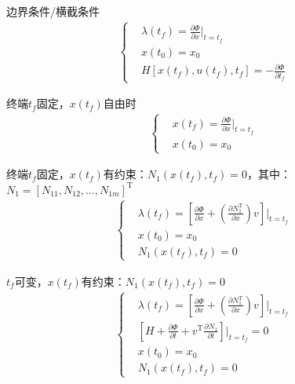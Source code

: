             边界条件/横截条件
            \begin{align*}
            \left\{
            \begin{aligned}
            & \lambda(t_f) = \frac{\partial \Phi}{\partial x}\Big|_{t=t_f}\\
            & x(t_0) = x_0\\
            & H[x(t_f),u(t_f),t_f] = -\frac{\partial \Phi}{\partial t_f}
            \end{aligned}
            \right.
            \end{align*}
            \par
            终端$t_f$固定，$x(t_f)$自由时
            \begin{align*}
            \left\{
            \begin{aligned}
            & x(t_f) = \frac{\partial \Phi}{\partial x}\Big|_{t=t_f}\\
            & x(t_0) = x_0
            \end{aligned}
            \right.
            \end{align*}
            \par
            终端$t_f$固定，$x(t_f)$有约束：$N_1(x(t_f),t_f) = 0$，其中：$N_1 = [N_{11},N_{12},\dots,N_{1m}]^\mathrm{T}$
            \begin{align*}
            \left\{
            \begin{aligned}
            & \lambda(t_f) = \left[ \frac{\partial \Phi}{\partial x}+\left( \frac{\partial N_1^\mathrm{T}}{\partial x} \right)v  \right]\Big|_{t=t_f}\\
            & x(t_0) = x_0\\
            & N_1(x(t_f),t_f) = 0
            \end{aligned}
            \right.
            \end{align*}
            \par
            $t_f$可变，$x(t_f)$有约束：$N_1(x(t_f),t_f) = 0$
            \begin{align*}
            \left\{
            \begin{aligned}
            & \lambda(t_f) = \left[ \frac{\partial \Phi}{\partial x}+\left( \frac{\partial N_1^\mathrm{T}}{\partial x} \right)v  \right]\Big|_{t=t_f}\\
            & \left[ H+\frac{\partial \Phi}{\partial t}+v^\mathrm{T}\frac{\partial N_1}{\partial t}  \right]\Big|_{t=t_f} = 0\\
            & x(t_0) = x_0\\
            & N_1(x(t_f),t_f) = 0
            \end{aligned}
            \right.
            \end{align*}
